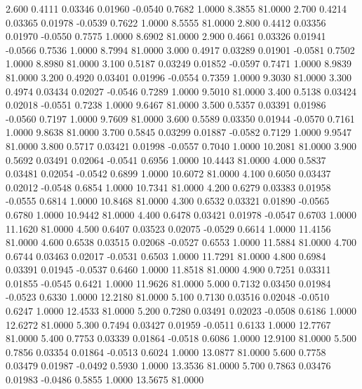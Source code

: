   2.600   0.4111   0.03346   0.01960  -0.0540   0.7682   1.0000   8.3855  81.0000
   2.700   0.4214   0.03365   0.01978  -0.0539   0.7622   1.0000   8.5555  81.0000
   2.800   0.4412   0.03356   0.01970  -0.0550   0.7575   1.0000   8.6902  81.0000
   2.900   0.4661   0.03326   0.01941  -0.0566   0.7536   1.0000   8.7994  81.0000
   3.000   0.4917   0.03289   0.01901  -0.0581   0.7502   1.0000   8.8980  81.0000
   3.100   0.5187   0.03249   0.01852  -0.0597   0.7471   1.0000   8.9839  81.0000
   3.200   0.4920   0.03401   0.01996  -0.0554   0.7359   1.0000   9.3030  81.0000
   3.300   0.4974   0.03434   0.02027  -0.0546   0.7289   1.0000   9.5010  81.0000
   3.400   0.5138   0.03424   0.02018  -0.0551   0.7238   1.0000   9.6467  81.0000
   3.500   0.5357   0.03391   0.01986  -0.0560   0.7197   1.0000   9.7609  81.0000
   3.600   0.5589   0.03350   0.01944  -0.0570   0.7161   1.0000   9.8638  81.0000
   3.700   0.5845   0.03299   0.01887  -0.0582   0.7129   1.0000   9.9547  81.0000
   3.800   0.5717   0.03421   0.01998  -0.0557   0.7040   1.0000  10.2081  81.0000
   3.900   0.5692   0.03491   0.02064  -0.0541   0.6956   1.0000  10.4443  81.0000
   4.000   0.5837   0.03481   0.02054  -0.0542   0.6899   1.0000  10.6072  81.0000
   4.100   0.6050   0.03437   0.02012  -0.0548   0.6854   1.0000  10.7341  81.0000
   4.200   0.6279   0.03383   0.01958  -0.0555   0.6814   1.0000  10.8468  81.0000
   4.300   0.6532   0.03321   0.01890  -0.0565   0.6780   1.0000  10.9442  81.0000
   4.400   0.6478   0.03421   0.01978  -0.0547   0.6703   1.0000  11.1620  81.0000
   4.500   0.6407   0.03523   0.02075  -0.0529   0.6614   1.0000  11.4156  81.0000
   4.600   0.6538   0.03515   0.02068  -0.0527   0.6553   1.0000  11.5884  81.0000
   4.700   0.6744   0.03463   0.02017  -0.0531   0.6503   1.0000  11.7291  81.0000
   4.800   0.6984   0.03391   0.01945  -0.0537   0.6460   1.0000  11.8518  81.0000
   4.900   0.7251   0.03311   0.01855  -0.0545   0.6421   1.0000  11.9626  81.0000
   5.000   0.7132   0.03450   0.01984  -0.0523   0.6330   1.0000  12.2180  81.0000
   5.100   0.7130   0.03516   0.02048  -0.0510   0.6247   1.0000  12.4533  81.0000
   5.200   0.7280   0.03491   0.02023  -0.0508   0.6186   1.0000  12.6272  81.0000
   5.300   0.7494   0.03427   0.01959  -0.0511   0.6133   1.0000  12.7767  81.0000
   5.400   0.7753   0.03339   0.01864  -0.0518   0.6086   1.0000  12.9100  81.0000
   5.500   0.7856   0.03354   0.01864  -0.0513   0.6024   1.0000  13.0877  81.0000
   5.600   0.7758   0.03479   0.01987  -0.0492   0.5930   1.0000  13.3536  81.0000
   5.700   0.7863   0.03476   0.01983  -0.0486   0.5855   1.0000  13.5675  81.0000
